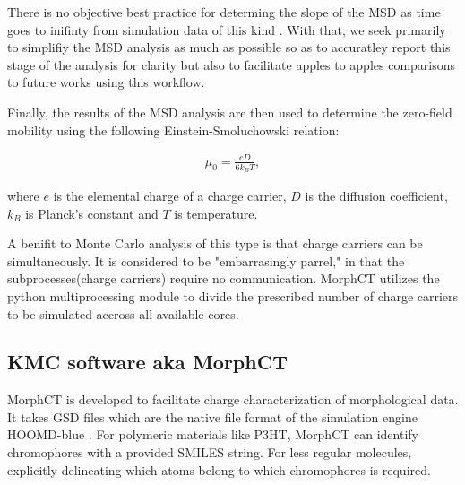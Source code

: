 There is no objective best practice for determing the slope of the MSD as
time goes to inifinty from simulation data of this kind \cite{Maginn2018}. With that, we seek primarily to simplifiy the MSD analysis as much as
possible so as to accuratley report this stage of the analysis for clarity but also to facilitate apples to
apples comparisons to future works using this workflow. 

Finally, the results of the MSD analysis are then used to determine the zero-field mobility using the following Einstein-Smoluchowski relation:

\begin{align}
    \mu_{0} = \frac{eD}{6k_{B}T},
\end{align}

where $e$ is the elemental charge of a charge carrier, $D$ is the diffusion coefficient, $k_{B}$ is Planck's
constant and $T$ is temperature.  

A benifit to Monte Carlo analysis of this type is that charge carriers can be simultaneously. It is considered
to be "embarrasingly parrel," in that the subprocesses(charge carriers) require no communication.
MorphCT utilizes the python multiprocessing module to divide the prescribed number of charge carriers to be
simulated accross all available cores.  

\subsection{KMC software aka MorphCT}
\label{morph}
MorphCT is developed to facilitate charge characterization of morphological data. It takes GSD files which are
the native file format of the simulation engine HOOMD-blue \cite{Anderson2020a}.
For polymeric materials like P3HT, MorphCT
can identify chromophores with a provided SMILES string. For less regular molecules, explicitly delineating
which atoms belong to which chromophores is required.
